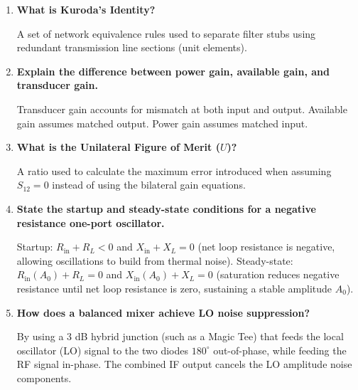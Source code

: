 \documentclass[12pt,a4paper]{article}
\newcommand{\Q}[1]{\textbf{#1}\par\noindent\ignorespaces}
\begin{document}
\begin{tcolorbox}[exambox, title={\textbf{Frequently Asked / Viva Questions}}]
\begin{enumerate}[topsep=0pt, label=\textbf{Q\arabic*.}, itemsep=5pt]
    Mathematical maps that convert lumped inductors and capacitors into transmission line stubs ($\text{L} \to \text{short stub}$, $\text{C} \to \text{open stub}$) at microwave frequencies.
  \item \Q{What is Kuroda's Identity?}
    A set of network equivalence rules used to separate filter stubs using redundant transmission line sections (unit elements).
  \item \Q{Explain the difference between power gain, available gain, and transducer gain.}
    Transducer gain accounts for mismatch at both input and output. Available gain assumes matched output. Power gain assumes matched input.
  \item \Q{What is the Unilateral Figure of Merit ($U$)?}
    A ratio used to calculate the maximum error introduced when assuming $S_{12} = 0$ instead of using the bilateral gain equations.
  \item \Q{State the startup and steady-state conditions for a negative resistance one-port oscillator.}
    Startup: $R_{\text{in}} + R_L < 0$ and $X_{\text{in}} + X_L = 0$ (net loop resistance is negative, allowing oscillations to build from thermal noise). Steady-state: $R_{\text{in}}(A_0) + R_L = 0$ and $X_{\text{in}}(A_0) + X_L = 0$ (saturation reduces negative resistance until net loop resistance is zero, sustaining a stable amplitude $A_0$).
  \item \Q{How does a balanced mixer achieve LO noise suppression?}
    By using a 3 dB hybrid junction (such as a Magic Tee) that feeds the local oscillator (LO) signal to the two diodes $180^\circ$ out-of-phase, while feeding the RF signal in-phase. The combined IF output cancels the LO amplitude noise components.
\end{enumerate}
\end{tcolorbox}
\end{document}
